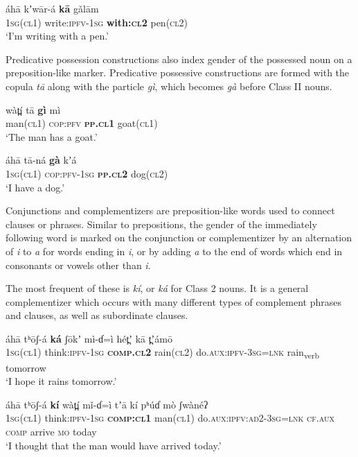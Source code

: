 \documentclass[output=collectionpaper,hidelinks]{langscibook}
\theoremstyle{remark}
\begin{document}
\ea
\gll  áhā kʼwār-á \textbf{kā} gǎlām \\
 \textsc{1sg}(\textsc{cl1}) write:\textsc{ipfv}-\textsc{1sg} \textbf{with:\textsc{cl2}} pen(\textsc{cl2}) \\
\glt `I'm writing with a pen.' \\
\z

Predicative possession constructions also index gender of the possessed noun on
a preposition-like marker.  Predicative possessive constructions are formed with
the copula \emph{tā} along with the particle \emph{gì}, which becomes
\emph{gà} before Class II nouns. \nocite{James1979}

\ea
\gll  wàt̪í tā \textbf{gì} mì \\
 man(\textsc{cl1}) \textsc{cop}:\textsc{pfv} \textbf{\textsc{pp.cl1}} goat(\textsc{cl1}) \\
\glt `The man has a goat.' \\
\z

\ea
\gll  áhā tā-ná \textbf{gà} kʼá \\
 \textsc{1sg}(\textsc{cl1}) \textsc{cop}:\textsc{pfv}-\textsc{1sg} \textbf{\textsc{pp.cl2}} dog(\textsc{cl2}) \\
\glt `I have a dog.' \\
\z

Conjunctions and complementizers are preposition-like words used to connect
clauses or phrases. Similar to prepositions, the gender of the immediately
following word is marked on the conjunction or complementizer by an alternation
of \emph{i} to \emph{a} for words ending in \emph{i}, or by adding \emph{a} to
the end of words which end in consonants or vowels other than \emph{i}.

The most frequent of these is \emph{kí}, or \emph{ká} for Class 2 nouns. It
is a general complementizer which occurs with many different types of complement
phrases and clauses, as well as subordinate clauses.

\ea
\gll  áhā tʰōʃ-á \textbf{ká} ʃōkʼ mì-ɗ=ì hét̪ʼ {kā t̪ʼámō} \\
 \textsc{1sg}(\textsc{cl1}) think:\textsc{ipfv}-\textsc{1sg} \textbf{\textsc{comp.cl2}} rain(\textsc{cl2}) do.\textsc{aux}:\textsc{ipfv}-\textsc{3sg}=\textsc{lnk} rain\textsubscript{verb} tomorrow \\
\glt `I hope it rains tomorrow.' \\
\z

\ea
\gll  áhā tʰōʃ-á \textbf{kí} wàt̪í mǐ-ɗ=ì tʼā kí pʰúɗ mò ʃwànéʔ \\
 \textsc{1sg}(\textsc{cl1}) think:\textsc{ipfv}-\textsc{1sg} \textbf{\textsc{comp:cl1}} man(\textsc{cl1}) do.\textsc{aux}:\textsc{ipfv:ad2}-\textsc{3sg}=\textsc{lnk} \textsc{cf.aux} \textsc{comp} arrive \textsc{mo} today \\
\glt `I thought that the man would have arrived today.' \\
\z
\end{document}
